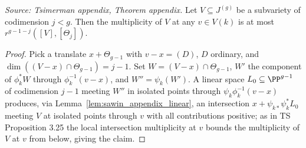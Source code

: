 \begin{theorem}
  \label{thm:sawin_appendix}
  \textit{Source: Tsimerman appendix, Theorem appendix.}
  Let $V\subseteq J^{(g)}$ be a subvariety of codimension $j<g$.  Then the
  multiplicity of $V$ at any $v\in V(k)$ is at most $r^{g-1-j}([V],[\Theta_j])$.
\end{theorem}
\begin{proof}
  Pick a translate $x+\Theta_{g-1}$ with $v-x=(D)$, $D$ ordinary, and
  $\dim((V-x)\cap\Theta_{g-1})=j-1$.  Set $W=(V-x)\cap\Theta_{g-1}$, $W'$ the
  component of $\phi_k^*W$ through $\phi_k^{-1}(v-x)$, and $W''=\psi_k(W')$.  A
  linear space $L_0\subseteq\PP^{g-1}$ of codimension $j-1$ meeting $W''$ in
  isolated points through $\psi_k\phi_k^{-1}(v-x)$ produces, via
  Lemma~\ref{lem:sawin_appendix_linear}, an intersection
  $x+\psi_{k*}\psi_k^*L_0$ meeting $V$ at isolated points through $v$ with all
  contributions positive; as in TS Proposition 3.25 the local intersection
  multiplicity at $v$ bounds the multiplicity of $V$ at $v$ from below, giving the
  claim.
\end{proof}
